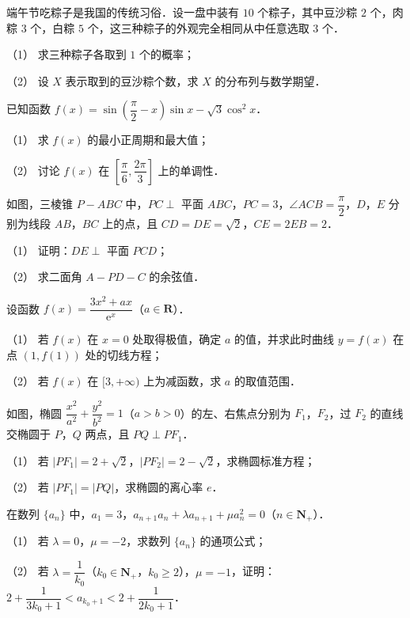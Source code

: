 \begin{question}
端午节吃粽子是我国的传统习俗．设一盘中装有 $10$ 个粽子，其中豆沙粽 $2$ 个，肉粽 $3$ 个，白粽 $5$ 个，这三种粽子的外观完全相同从中任意选取 $3$ 个．

（1） 求三种粽子各取到 $1$ 个的概率；

（2） 设 $X$ 表示取到的豆沙粽个数，求 $X$ 的分布列与数学期望．

\end{question}
\begin{question}
已知函数 $f(x)=\sin\left(\dfrac{\pi}{2}-x\right)\sin x-\sqrt{3}\cos^{2}x$．

（1） 求 $f(x)$ 的最小正周期和最大值；

（2） 讨论 $f(x)$ 在 $\left[\dfrac{\pi}{6},\dfrac{2\pi}{3}\right]$ 上的单调性．

\Needspace{0.4\textheight}
\end{question}
\begin{question}
如图，三棱锥 $P-ABC$ 中，$PC\perp$ 平面 $ABC$，$PC=3$，$\angle ACB=\dfrac{\pi}{2}$，$D$，$E$ 分别为线段 $AB$，$BC$ 上的点，且 $CD=DE=\sqrt{2}$，$CE=2EB=2$．

（1） 证明：$DE\perp$ 平面 $PCD$；

（2） 求二面角 $A-PD-C$ 的余弦值．
\nopagebreak[4]
\begin{center}\end{center}
\nopagebreak[4]
\end{question}
\begin{question}
设函数 $f(x)=\dfrac{3x^{2}+ax}{\mathrm{e}^{x}}$（$a\in\mathbf{R}$）．

（1） 若 $f(x)$ 在 $x=0$ 处取得极值，确定 $a$ 的值，并求此时曲线 $y=f(x)$ 在点 $(1,f(1))$ 处的切线方程；

（2） 若 $f(x)$ 在 $[3,+\infty)$ 上为减函数，求 $a$ 的取值范围．

\Needspace{0.4\textheight}
\end{question}
\begin{question}
如图，椭圆 $\dfrac{x^{2}}{a^{2}}+\dfrac{y^{2}}{b^{2}}=1$（$a>b>0$）的左、右焦点分别为 $F_{1}$，$F_{2}$，过 $F_{2}$ 的直线交椭圆于 $P$，$Q$ 两点，且 $PQ\perp PF_{1}$．

（1） 若 $|PF_{1}|=2+\sqrt{2}$，$|PF_{2}|=2-\sqrt{2}$，求椭圆标准方程；

（2） 若 $|PF_{1}|=|PQ|$，求椭圆的离心率 $e$．
\nopagebreak[4]
\begin{center}\end{center}
\nopagebreak[4]
\end{question}
\begin{question}
在数列 $\{a_{n}\}$ 中，$a_{1}=3$，$a_{n+1}a_{n}+\lambda a_{n+1}+\mu a_{n}^{2}=0$（$n\in\mathbf{N}_{+}$）．

（1） 若 $\lambda=0$，$\mu=-2$，求数列 $\{a_{n}\}$ 的通项公式；

（2） 若 $\lambda=\dfrac{1}{k_{0}}$（$k_{0}\in\mathbf{N}_{+}$，$k_{0}\ge 2$），$\mu=-1$，证明：$2+\dfrac{1}{3k_{0}+1}<a_{k_{0}+1}<2+\dfrac{1}{2k_{0}+1}$．

\end{question}